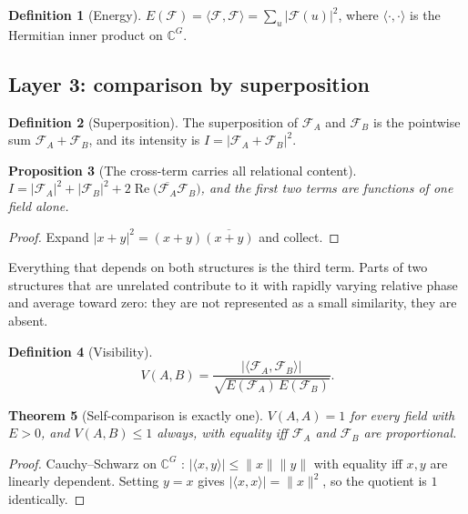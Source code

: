 \documentclass[11pt,twocolumn,a4paper]{article}
\theoremstyle{upthm}
\newtheorem{theorem}{Theorem}[section]
\newtheorem{proposition}[theorem]{Proposition}
\theoremstyle{definition}
\newtheorem{definition}[theorem]{Definition}
\theoremstyle{remark}
\newcommand{\C}{\mathbb{C}}
\newcommand{\Field}{\mathcal{F}}
\newcommand{\vis}{V}
\newcommand{\abs}[1]{\lvert#1\rvert}
\newcommand{\norm}[1]{\lVert#1\rVert}
\newcommand{\inner}[2]{\langle#1,#2\rangle}
\begin{document}
\begin{definition}[Energy]
\label{def:energy}
$E(\Field)=\inner{\Field}{\Field}=\sum_u\abs{\Field(u)}^2$, where
$\inner{\cdot}{\cdot}$ is the Hermitian inner product on $\C^G$.
\end{definition}

\subsection{Layer 3: comparison by superposition}

\begin{definition}[Superposition]
\label{def:super}
The superposition of $\Field_A$ and $\Field_B$ is the pointwise sum
$\Field_A+\Field_B$, and its intensity is
$I=\abs{\Field_A+\Field_B}^2$.
\end{definition}

\begin{proposition}[The cross-term carries all relational content]
\label{prop:cross}
$I=\abs{\Field_A}^2+\abs{\Field_B}^2
  +2\operatorname{Re}\bigl(\overline{\Field_A}\Field_B\bigr)$,
and the first two terms are functions of one field alone.
\end{proposition}

\begin{proof}
Expand $\abs{x+y}^2=(x+y)\overline{(x+y)}$ and collect.
\end{proof}

Everything that depends on both structures is the third term. Parts of
two structures that are unrelated contribute to it with rapidly varying
relative phase and average toward zero: they are not represented as a
small similarity, they are absent.

\begin{definition}[Visibility]
\label{def:vis}
\begin{equation}
\vis(A,B)=\frac{\abs{\inner{\Field_A}{\Field_B}}}
  {\sqrt{E(\Field_A)\,E(\Field_B)}}.
\label{eq:vis}
\end{equation}
\end{definition}

\begin{theorem}[Self-comparison is exactly one]
\label{thm:selfone}
$\vis(A,A)=1$ for every field with $E>0$, and $\vis(A,B)\le1$ always,
with equality iff $\Field_A$ and $\Field_B$ are proportional.
\end{theorem}

\begin{proof}
Cauchy--Schwarz on $\C^G$ \citep{steele1997,horn2012}:
$\abs{\inner{x}{y}}\le\norm{x}\norm{y}$ with equality iff $x,y$ are
linearly dependent. Setting $y=x$ gives
$\abs{\inner{x}{x}}=\norm{x}^2$, so the quotient is $1$ identically.
\end{proof}
\end{document}
